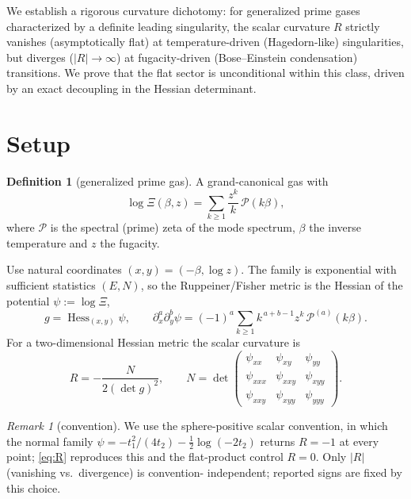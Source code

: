 \documentclass[a4paper,11pt]{article}
\theoremstyle{plain}
\theoremstyle{definition}
\newtheorem{definition}{Definition}
\theoremstyle{remark}
\newtheorem{remark}{Remark}
\newcommand{\Ric}{R}
\newcommand{\Hess}{\operatorname{Hess}}
\newcommand{\detg}{\det g}
\begin{document}
We establish a rigorous curvature dichotomy: for generalized prime gases characterized by a definite
leading singularity, the scalar curvature $R$ strictly vanishes (asymptotically flat) at
temperature-driven (Hagedorn-like) singularities, but diverges ($|R|\to\infty$) at fugacity-driven
(Bose--Einstein condensation) transitions. We prove that the flat sector is unconditional within this
class, driven by an exact decoupling in the Hessian determinant.

\section{Setup}\label{sec:setup}

\begin{definition}[generalized prime gas]\label{def:gas}
A grand-canonical gas with
\begin{equation}\label{eq:logXi}
   \log\Xi(\beta,z)=\sum_{k\ge1}\frac{z^k}{k}\,\mathcal P(k\beta),
\end{equation}
where $\mathcal P$ is the spectral (prime) zeta of the mode spectrum, $\beta$ the inverse temperature
and $z$ the fugacity.
\end{definition}

Use natural coordinates $(x,y)=(-\beta,\log z)$. The family is exponential with sufficient statistics
$(E,N)$, so the Ruppeiner/Fisher metric is the Hessian of the potential $\psi:=\log\Xi$,
\begin{equation}\label{eq:metric}
   g=\Hess_{(x,y)}\psi,\qquad
   \partial_x^{a}\partial_y^{b}\psi=(-1)^{a}\sum_{k\ge1}k^{\,a+b-1}z^{k}\,\mathcal P^{(a)}(k\beta).
\end{equation}
For a two-dimensional Hessian metric the scalar curvature is
\begin{equation}\label{eq:R}
   \Ric=-\frac{N}{2(\detg)^{2}},\qquad
   N=\det\!\begin{pmatrix}
       \psi_{xx} & \psi_{xy} & \psi_{yy}\\
       \psi_{xxx}& \psi_{xxy}& \psi_{xyy}\\
       \psi_{xxy}& \psi_{xyy}& \psi_{yyy}
     \end{pmatrix}.
\end{equation}

\begin{remark}[convention]\label{rem:convention}
We use the sphere-positive scalar convention, in which the normal family
$\psi=-t_1^2/(4t_2)-\tfrac12\log(-2t_2)$ returns $\Ric=-1$ at every point; \eqref{eq:R} reproduces
this and the flat-product control $\Ric=0$. Only $|\Ric|$ (vanishing vs.\ divergence) is convention-
independent; reported signs are fixed by this choice.
\end{remark}
\end{document}
